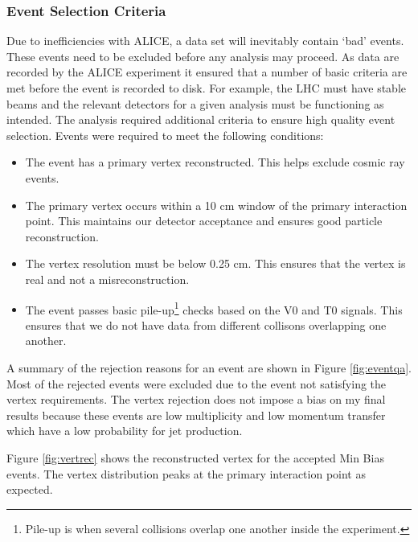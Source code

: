 \subsubsection{Event Selection Criteria}
Due to inefficiencies with ALICE, a data set will inevitably contain `bad' events.  These events need to be excluded before any analysis may proceed.  As data are recorded by the ALICE experiment it ensured that a number of basic criteria are met before the event is recorded to disk.  For example, the LHC must have stable beams and the relevant detectors for a given analysis must be functioning as intended.  The analysis required additional criteria to ensure high quality event selection.  Events were required to meet the following conditions:

\begin{itemize}
  \item The event has a primary vertex reconstructed.  This helps exclude cosmic ray events.
  \item The primary vertex occurs within a 10 cm window of the primary interaction point.  This maintains our detector acceptance and ensures good particle reconstruction.
  \item The vertex resolution must be below 0.25 cm.  This ensures that the vertex is real and not a misreconstruction.
  \item The event passes basic pile-up\footnote{Pile-up is when several collisions overlap one another inside the experiment.} checks based on the V0 and T0 signals.  This ensures that we do not have data from different collisons overlapping one another.
\end{itemize}


A summary of the rejection reasons for an event are shown in Figure \ref{fig:eventqa}.  Most of the rejected events were excluded due to the event not satisfying the vertex requirements.  The vertex rejection does not impose a bias on my final results because these events are low multiplicity and low momentum transfer which have a low probability for jet production.

Figure \ref{fig:vertrec} shows the reconstructed vertex for the accepted Min Bias events.  The vertex distribution peaks at the primary interaction point as expected. 



